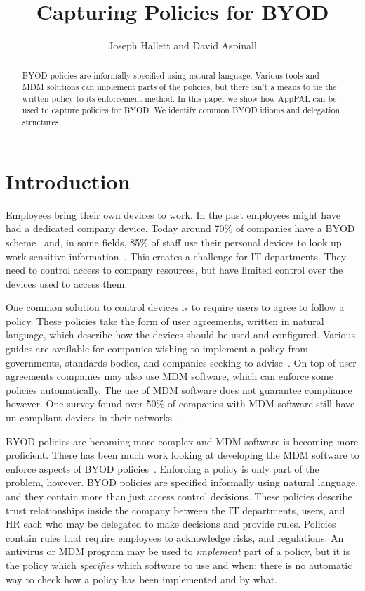 \documentclass{easychair}
\title{Capturing Policies for BYOD}
\author{Joseph Hallett and David Aspinall}
\institute{University of Edinburgh}
\begin{document}
\maketitle

\begin{abstract}
  BYOD policies are informally specified using natural language.
  Various tools and \ac{MDM} solutions can implement parts of the policies, but there isn't a means to tie the written policy to its enforcement method.
  In this paper we show how AppPAL can be used to capture policies for BYOD.
  We identify common BYOD idioms and delegation structures.
\end{abstract}

\section{Introduction}
\label{sec:intro}

Employees bring their own devices to work.
In the past employees might have had a dedicated company device.
Today around 70\% of companies have a BYOD scheme~\cite{schulze_byod_2016} and, in some fields,
  85\% of staff use their personal devices to look up work-sensitive information~\cite{patel_uk_2015}.
This creates a challenge for IT departments.
They need to control access to company resources, but have limited control over the devices used to access them.

One common solution to control devices is to require users to agree to follow a policy.
These policies take the form of user agreements, written in natural language, which describe how the devices should be used and configured.
Various guides are available for companies wishing to implement a policy from governments, standards bodies, and companies seeking to advise~\cite{nicholas_r._c._guerin_security_2008,souppaya_guidelines_????,hp_byod_????,cesg_byod_2015}.
On top of user agreements companies may also use \ac{MDM} software, which can enforce some policies automatically.
The use of \ac{MDM} software does not guarantee compliance however.
One survey found over 50\% of companies with \ac{MDM} software still have un-compliant devices in their networks~\cite{mobileiron_security_labs_q4_2015}.

BYOD policies are becoming more complex and \ac{MDM} software is becoming more proficient.
There has been much work looking at developing the \ac{MDM} software to enforce aspects of BYOD policies~\cite{costantino_towards_2013,martinelli_enhancing_2016,armando_enabling_2014}.
Enforcing a policy is only part of the problem, however.
BYOD policies are specified informally using natural language, and they contain more than just access control decisions.
These policies describe trust relationships inside the company between the IT departments, users, and HR each who may be delegated to make decisions and provide rules.
Policies contain rules that require employees to acknowledge risks, and regulations.
An antivirus or \ac{MDM} program may be used to \emph{implement} part of a policy, but it is the policy which \emph{specifies} which software to use and when; there is no automatic way to check how a policy has been implemented and by what.
\end{document}
